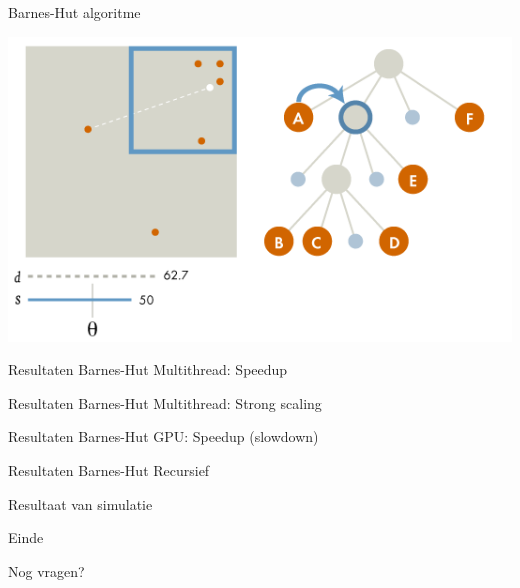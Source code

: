 \documentclass{beamer}
\begin{document}
	\begin{frame}{Barnes-Hut algoritme}
		\begin{center}
			\includegraphics[width= 0.8\linewidth]{quadTreeBH.png}
		\end{center}
	\end{frame}

	\begin{frame}{Resultaten Barnes-Hut Multithread: Speedup}
		\begin{center}
			\resizebox{!}{.7\paperheight}{}
		\end{center}
	\end{frame}

	\begin{frame}{Resultaten Barnes-Hut Multithread: Strong scaling}
		\begin{center}
			\resizebox{!}{.7\paperheight}{}
		\end{center}
	\end{frame}

	\begin{frame}{Resultaten Barnes-Hut GPU: Speedup (slowdown)}
		\begin{center}
			\resizebox{!}{.7\paperheight}{}
		\end{center}
	\end{frame}

	\begin{frame}{Resultaten Barnes-Hut Recursief}
		\begin{center}
			\resizebox{!}{.7\paperheight}{}
		\end{center}
	\end{frame}
	
	\begin{frame}{Resultaat van simulatie}
		\begin{center}
		\end{center}
	\end{frame}
	
	\begin{frame}{Einde}
		\begin{center}
			Nog vragen?
		\end{center}
	\end{frame}
	
\end{document}
